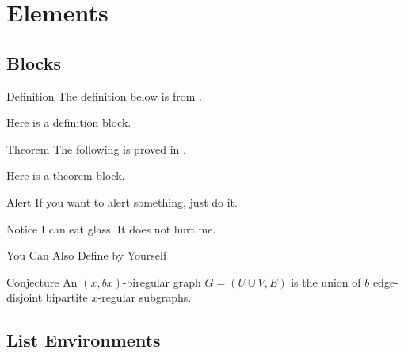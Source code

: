 \section{Elements}

\subsection{Blocks}

\begin{frame}{Definition}
	The definition below is from \cite{angluin1980local}.

	\begin{definition}
		Here is a definition block.
	\end{definition}
\end{frame}

\begin{frame}{Theorem}
	The following is proved in \cite[pp.~74--75]{yamashita1996computing1}.

	\begin{theorem}
		Here is a theorem block.
	\end{theorem}
\end{frame}

\begin{frame}{Alert}
	If you want to alert something, \alert{just do it}.

	\begin{alertblock}{Notice}
		I can eat glass. It does not hurt me.
	\end{alertblock}
\end{frame}

\begin{frame}{You Can Also Define by Yourself}
	\begin{block}{Conjecture}
		An \((x, bx)\)-biregular graph \(G = (U \cup V, E)\) is the union of \(b\) edge-disjoint bipartite \(x\)-regular subgraphs.
	\end{block}
\end{frame}

\subsection{List Environments}

